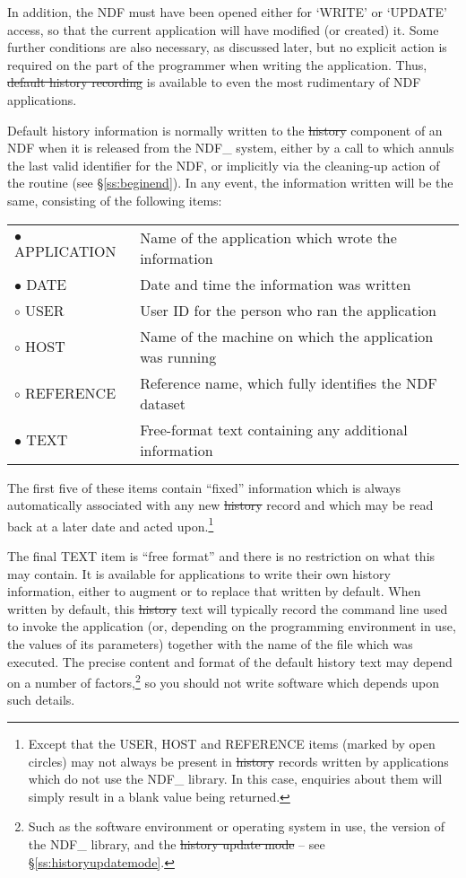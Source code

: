 In addition, the NDF must have been opened either for `WRITE' or
`UPDATE' access, so that the current application will have modified
(or created) it. Some further conditions are also necessary, as
discussed later, but no explicit action is required on the part of the
programmer when writing the application. Thus, \st{default history
recording\/} is available to even the most rudimentary of NDF
applications.

Default history information is normally written to the \st{history\/}
component of an NDF when it is released from the NDF\_ system, either
by a call to  which annuls the last valid identifier for the
NDF, or implicitly via the cleaning-up action of the  routine
(see \S\ref{ss:beginend}). In any event, the information written will be the
same, consisting of the following items:

\begin{center}
\begin{tabular}{l@{ -- }l}
$\bullet$ APPLICATION & Name of the application which wrote the information\\
$\bullet$ DATE & Date and time the information was written\\
$\circ$ USER & User ID for the person who ran the application\\
$\circ$ HOST & Name of the machine on which the application was running\\
$\circ$ REFERENCE & Reference name, which fully identifies the NDF
dataset\\[1ex]
$\bullet$ TEXT & Free-format text containing any additional information
\end{tabular}
\end{center}

The first five of these items contain ``fixed'' information which is
always automatically associated with any new \st{history\/} record and
which may be read back at a later date and acted upon.\footnote{Except
that the USER, HOST and REFERENCE items (marked by open circles) may
not always be present in \st{history\/} records written by applications
which do not use the NDF\_ library. In this case, enquiries about them
will simply result in a blank value being returned.}

The final TEXT item is ``free format'' and there is no restriction on
what this may contain. It is available for applications to write their
own history information, either to augment or to replace that written
by default.  When written by default, this \st{history\/} text will
typically record the command line used to invoke the application (or,
depending on the programming environment in use, the values of its
parameters) together with the name of the file which was executed.
The precise content and format of the default history text may depend
on a number of factors,\footnote{Such as the software environment or
operating system in use, the version of the NDF\_ library, and the
\st{history update mode\/} -- see \S\ref{ss:historyupdatemode}.} so you
should not write software which depends upon such details.

